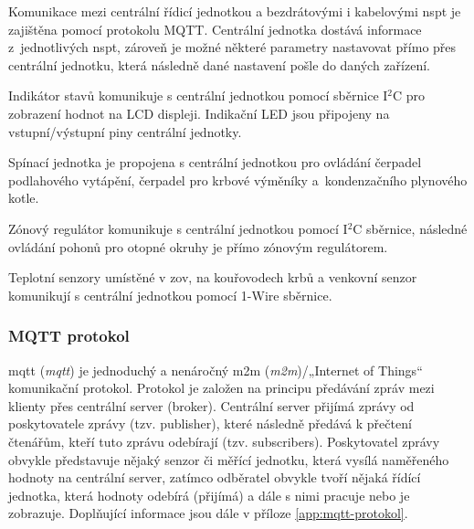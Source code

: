 Komunikace mezi centrální řídicí jednotkou a bezdrátovými i kabelovými \acrshort{nspt} je zajištěna pomocí protokolu MQTT. Centrální jednotka dostává informace z~jednotlivých \acrshort{nspt}, zároveň je možné některé parametry nastavovat přímo přes centrální jednotku, která následně dané nastavení pošle do daných zařízení.

Indikátor stavů komunikuje s centrální jednotkou pomocí sběrnice I$^2$C pro zobrazení hodnot na LCD displeji. Indikační LED jsou připojeny  na vstupní/výstupní piny centrální jednotky.

Spínací jednotka je propojena s centrální jednotkou pro ovládání čerpadel podlahového vytápění, čerpadel pro krbové výměníky a~kondenzačního plynového kotle.

Zónový regulátor komunikuje s centrální jednotkou pomocí I$^2$C sběrnice, následné ovládání pohonů pro otopné okruhy je přímo zónovým regulátorem.

Teplotní senzory umístěné v \acrshort{zov}, na kouřovodech krbů a venkovní senzor komunikují s centrální jednotkou pomocí 1-Wire sběrnice.



\subsubsection{MQTT protokol}
\label{sec:mqtt-protokol}

\acrshort{mqtt} \cite{mqtt-specifikace} (\textit{\acrlong{mqtt}}) je jednoduchý a nenáročný \acrshort{m2m} (\textit{\acrlong{m2m}})/„Internet of Things“ komunikační protokol. Protokol je založen na principu předávání zpráv mezi klienty přes centrální server (broker). Centrální server přijímá zprávy od poskytovatele zprávy (tzv. publisher), které následně předává k přečtení čtenářům, kteří tuto zprávu odebírají (tzv. subscribers). Poskytovatel zprávy obvykle představuje nějaký senzor či měřící jednotku, která vysílá naměřeného hodnoty na centrální server, zatímco odběratel obvykle tvoří nějaká řídící jednotka, která hodnoty odebírá (přijímá) a dále s nimi pracuje nebo je zobrazuje. \cite{vojacek-mqtt} Doplňující informace jsou dále v příloze \ref{app:mqtt-protokol}.

